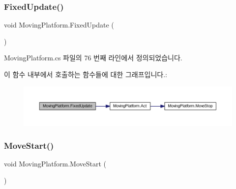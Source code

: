 \subsubsection{\texorpdfstring{FixedUpdate()}{FixedUpdate()}}
{\footnotesize\ttfamily void Moving\+Platform.\+Fixed\+Update (\begin{DoxyParamCaption}{ }\end{DoxyParamCaption})\hspace{0.3cm}{\ttfamily [private]}}



Moving\+Platform.\+cs 파일의 76 번째 라인에서 정의되었습니다.


\begin{DoxyCode}{0}

\end{DoxyCode}
이 함수 내부에서 호출하는 함수들에 대한 그래프입니다.\+:
\nopagebreak
\begin{figure}[H]
\begin{center}
\leavevmode
\includegraphics[width=350pt]{df/d42/class_moving_platform_a935710333a3a0f0164dad887e8eb7d1c_cgraph}
\end{center}
\end{figure}
\mbox{\label{class_moving_platform_a2e7148eddf9ada2373e3507c02146896}} 
\subsubsection{\texorpdfstring{MoveStart()}{MoveStart()}}
{\footnotesize\ttfamily void Moving\+Platform.\+Move\+Start (\begin{DoxyParamCaption}{ }\end{DoxyParamCaption})}



